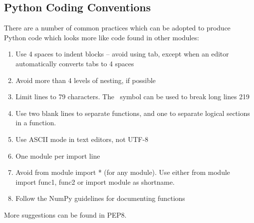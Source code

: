 \documentclass[KSmain.tex]{subfiles}
\begin{document}
\subsection{Python Coding Conventions}
There are a number of common practices which can be adopted to produce Python code which looks
more like code found in other modules:
\begin{enumerate}
\item Use 4 spaces to indent blocks – avoid using tab, except when an editor automatically converts tabs
to 4 spaces
\item Avoid more than 4 levels of nesting, if possible
\item Limit lines to 79 characters. The \ symbol can be used to break long lines
219
\item Use two blank lines to separate functions, and one to separate logical sections in a function.
\item Use ASCII mode in text editors, not UTF-8
\item One module per import line
\item Avoid from module import * (for any module). Use either from module import func1, func2 or
import module as shortname.
\item Follow the NumPy guidelines for documenting functions
\end{enumerate}

More suggestions can be found in PEP8.
\end{document}

